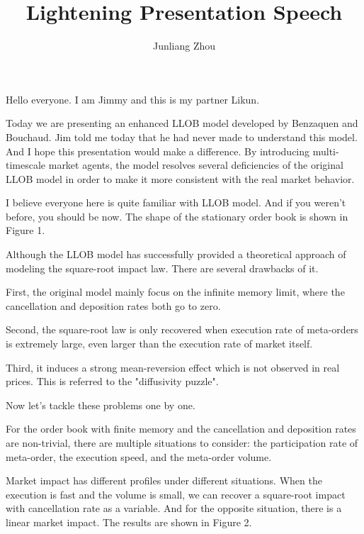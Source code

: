 \documentclass{article}
\title{Lightening Presentation Speech}
\author{Junliang Zhou}
\begin{document}
\maketitle

Hello everyone. I am Jimmy and this is my partner Likun. \newline

Today we are presenting an enhanced LLOB model developed by Benzaquen and Bouchaud. Jim told me today that he had never made to understand this model. And I hope this presentation would make a difference. By introducing multi-timescale market agents, the model resolves several deficiencies of the original LLOB model in order to make it more consistent with the real market behavior. \newline

I believe everyone here is quite familiar with LLOB model. And if you weren't before, you should be now. The shape of the stationary order book is shown in Figure 1. \newline

Although the LLOB model has successfully provided a theoretical approach of modeling the square-root impact law. There are several drawbacks of it. \newline

First, the original model mainly focus on the infinite memory limit, where the cancellation and deposition rates both go to zero. \newline

Second, the square-root law is only recovered when execution rate of meta-orders is extremely large, even larger than the execution rate of market itself. \newline

Third, it induces a strong mean-reversion effect which is not observed in real prices. This is referred to the "diffusivity puzzle". \newline

Now let's tackle these problems one by one. \newline

For the order book with finite memory and the cancellation and deposition rates are non-trivial, there are multiple situations to consider: the participation rate of meta-order, the execution speed, and the meta-order volume. \newline

Market impact has different profiles under different situations. When the execution is fast and the volume is small, we can recover a square-root impact with cancellation rate as a variable. And for the opposite situation, there is a linear market impact. The results are shown in Figure 2. \newline
\end{document}

